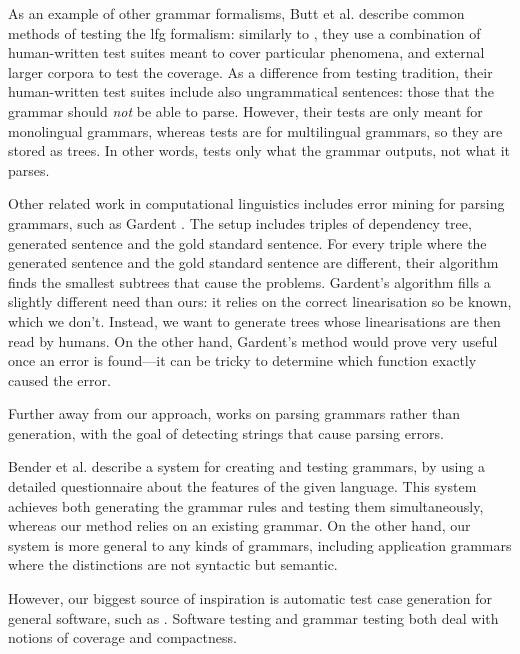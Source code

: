 As an example of other grammar formalisms, Butt et al.
\cite[pp.~212--213]{butt1999lfg} describe common methods of testing
the {\sc lfg} formalism: similarly to \gf, they use a combination of
human-written test suites meant to cover particular phenomena, and
external larger corpora to test the coverage. As a difference from \gf{}
testing tradition, their human-written test suites include also
ungrammatical sentences: those that the grammar should \emph{not} be
able to parse. However, their tests are only meant for monolingual
grammars, whereas \gf{} tests are for multilingual grammars, so they are
stored as trees. In other words, \gf{} tests only what the grammar
outputs, not what it parses.

Other related work in computational linguistics includes error mining
for parsing grammars, such as Gardent
\cite{gardent2012errormining}. The setup includes triples of dependency
tree, generated sentence and the gold standard sentence. For every triple
where the generated sentence and the gold standard sentence are different, their algorithm
finds the smallest subtrees that cause the problems. Gardent's
algorithm fills a slightly different need than ours: it relies on the
correct linearisation so be known, which we don't. Instead, we want to
generate trees whose linearisations are then read by humans. On the
other hand, Gardent's method would prove very useful once an error is
found---it can be tricky to determine which function exactly caused
the error.

Further away from our approach, 
works on parsing grammars rather than generation, with the goal of
detecting strings that cause parsing errors.

Bender et al. \cite{bender2010} describe a system for creating and
testing \hpsg{} \cite{pollard1994hpsg} grammars, by using a detailed
questionnaire about the features of the given language. This system
achieves both generating the grammar rules and testing them
simultaneously, whereas our method relies on an existing grammar. On
the other hand, our system is more general to any kinds of grammars,
including application grammars where the distinctions are not
syntactic but semantic.

However, our biggest source of inspiration is automatic test case
generation for general software, such as 
\cite{hamon2004testgen}. Software testing and grammar testing both
deal with notions of coverage and compactness.



